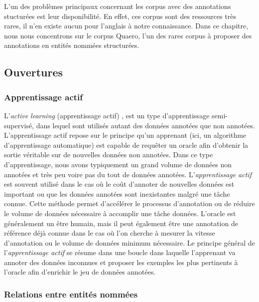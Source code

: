 \documentclass[PhD-Yoann-Dupont.tex]{subfiles}
\begin{document}
L'un des problèmes principaux concernant les corpus avec des annotations stucturées est leur disponibilité. En effet, ces corpus sont des ressources très rares, il n'en existe aucun pour l'anglais à notre connaissance. Dans ce chapitre, nous nous concentrons sur le corpus Quaero, l'un des rares corpus à proposer des annotations en entités nommées structurées.

\subsection*{Ouvertures}



\subsubsection*{Apprentissage actif}

L'\textit{active learning} (apprentissage actif) \citep{angluin1987learning,kinzel1990improving,baum1991neural,mackay1992information}, est un type d'apprentissage semi-supervisé, dans lequel sont utilisés autant des données annotées que non annotées. L'apprentissage actif repose sur le principe qu'un apprenant (ici, un algorithme d'apprentissage automatique) est capable de requêter un oracle afin d'obtenir la sortie véritable sur de nouvelles données non annotées. Dans ce type d'apprentissage, nous avons typiquement un grand volume de données non annotées et très peu voire pas du tout de données annotées. L'\textit{apprentissage actif} est souvent utilisé dans le cas où le coût d'annoter de nouvelles données est important ou que les données annotées sont inexistantes malgré une tâche connue. Cette méthode permet d'accélérer le processus d'annotation ou de réduire le volume de données nécessaire à accomplir une tâche données. L'oracle est généralement un être humain, mais il peut également être une annotation de référence déjà connue dans le cas où l'on cherche à mesurer la vitesse d'annotation ou le volume de données minimum nécessaire. Le principe général de l'\textit{apprentissage actif} se résume dans une boucle dans laquelle l'apprenant va annoter des données inconnues et proposer les exemples les plus pertinents à l'oracle afin d'enrichir le jeu de données annotées.


\subsubsection*{Relations entre entités nommées}
\end{document}
